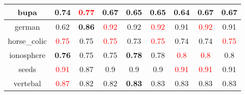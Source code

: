 \documentclass{article}%
\begin{document}
\begin{tabular}{c|cccccccc}
\hline%
bupa&0.74&\textcolor{red}{ 
0.77
}&\textbf{0.67}&0.65&\textbf{0.65}&0.64&0.67&0.67\\%
\hline%
german&0.62&\textbf{0.86}&\textcolor{red}{ 
0.92
}&0.92&\textcolor{red}{ 
0.92
}&0.91&\textcolor{red}{ 
0.92
}&0.91\\%
\hline%
horse\_colic&\textcolor{red}{ 
0.75
}&0.75&\textcolor{red}{ 
0.75
}&0.73&\textcolor{red}{ 
0.75
}&0.74&0.74&\textcolor{red}{ 
0.75
}\\%
\hline%
ionosphere&\textbf{0.76}&0.75&0.75&\textbf{0.78}&0.78&\textcolor{red}{ 
0.8
}&\textcolor{red}{ 
0.8
}&0.8\\%
\hline%
seeds&\textcolor{red}{ 
0.91
}&0.87&0.9&0.9&0.9&\textcolor{red}{ 
0.91
}&\textcolor{red}{ 
0.91
}&0.91\\%
\hline%
vertebal&\textcolor{red}{ 
0.87
}&0.82&0.82&\textbf{0.83}&0.83&0.83&0.83&0.83\\%
\hline%
\end{tabular}

%
\end{document}
